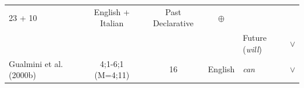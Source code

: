 \documentclass[oneside]{report}
\theoremstyle{definition}
\theoremstyle{definition}
\theoremstyle{definition}
\theoremstyle{remark}
\begin{document}
\begin{longtable}[]{@{}lccclc@{}}
\begin{minipage}[t]{0.05\columnwidth}
23 + 10\strut
\end{minipage} & \begin{minipage}[t]{0.10\columnwidth}\centering\strut
English + Italian\strut
\end{minipage} & \begin{minipage}[t]{0.25\columnwidth}\raggedright\strut
Past Declarative\strut
\end{minipage} & \begin{minipage}[t]{0.13\columnwidth}\centering\strut
\(\oplus\)\strut
\end{minipage}\tabularnewline
\begin{minipage}[t]{0.23\columnwidth}\raggedright\strut
\strut
\end{minipage} & \begin{minipage}[t]{0.07\columnwidth}\centering\strut
\strut
\end{minipage} & \begin{minipage}[t]{0.05\columnwidth}\centering\strut
\strut
\end{minipage} & \begin{minipage}[t]{0.10\columnwidth}\centering\strut
\strut
\end{minipage} & \begin{minipage}[t]{0.25\columnwidth}\raggedright\strut
Future (\emph{will})\strut
\end{minipage} & \begin{minipage}[t]{0.13\columnwidth}\centering\strut
\(\lor\)\strut
\end{minipage}\tabularnewline
\begin{minipage}[t]{0.23\columnwidth}\raggedright\strut
Gualmini et al. (2000b)\strut
\end{minipage} & \begin{minipage}[t]{0.07\columnwidth}\centering\strut
4;1-6;1 (M=4;11)\strut
\end{minipage} & \begin{minipage}[t]{0.05\columnwidth}\centering\strut
16\strut
\end{minipage} & \begin{minipage}[t]{0.10\columnwidth}\centering\strut
English\strut
\end{minipage} & \begin{minipage}[t]{0.25\columnwidth}\raggedright\strut
\emph{can}\strut
\end{minipage} & \begin{minipage}[t]{0.13\columnwidth}\centering\strut
\(\lor\)\strut
\end{minipage}\tabularnewline

\end{longtable}
\end{document}
